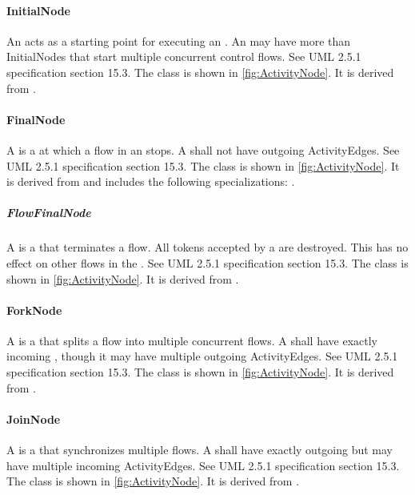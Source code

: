 \paragraph{InitialNode}%
\label{sec:uml:InitialNode}%
An  acts as a starting point for executing an . An  may have more than  InitialNodes that start multiple concurrent control flows. See UML 2.5.1 specification section 15.3.%
\newline%
\linebreak%
The  class is shown in \ref{fig:ActivityNode}. It is derived from .%
%
\paragraph{FinalNode}%
\label{sec:uml:FinalNode}%
A  is a  at which a flow in an  stops. A  shall not have outgoing ActivityEdges. See UML 2.5.1 specification section 15.3.%
\newline%
\linebreak%
The  class is shown in \ref{fig:ActivityNode}. It is derived from  and includes the following specializations: . %
%
\subparagraph{FlowFinalNode}%
\label{sec:uml:FlowFinalNode}%
A  is a  that terminates a flow. All tokens accepted by a  are destroyed. This has no effect on other flows in the . See UML 2.5.1 specification section 15.3.%
\newline%
\linebreak%
The  class is shown in \ref{fig:ActivityNode}. It is derived from .%
%
\paragraph{ForkNode}%
\label{sec:uml:ForkNode}%
A  is a  that splits a flow into multiple concurrent flows. A  shall have exactly  incoming , though it may have multiple outgoing ActivityEdges. See UML 2.5.1 specification section 15.3.%
\newline%
\linebreak%
The  class is shown in \ref{fig:ActivityNode}. It is derived from .%
%
\paragraph{JoinNode}%
\label{sec:uml:JoinNode}%
A  is a  that synchronizes multiple flows. A  shall have exactly  outgoing  but may have multiple incoming ActivityEdges. See UML 2.5.1 specification section 15.3.%
\newline%
\linebreak%
The  class is shown in \ref{fig:ActivityNode}. It is derived from .%
%
